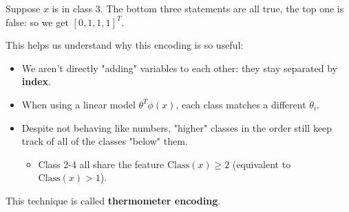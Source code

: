                 \miniex Suppose $x$ is in class 3. The bottom three statements are all true, the top one is false: so we get $[0, 1, 1, 1]^T$. 

                This helps us understand why this encoding is so useful:
                
                \begin{itemize}
                    \item We aren't directly "adding" variables to each other: they stay separated by \textbf{index}.
                    
                    \item When using a linear model $\theta^T\phi(x)$, each class  matches a different $\theta_i$.
                        
                    \item Despite not behaving like numbers, "higher" classes in the order still keep track of all of the classes "below" them.
                        \begin{itemize}
                            \item \miniex Class 2-4 all share the feature $\text{Class}(x)\geq 2$ (equivalent to $\text{Class}(x)>1$).
                        \end{itemize}
                \end{itemize}

                This technique is called \textbf{thermometer encoding}.\\

